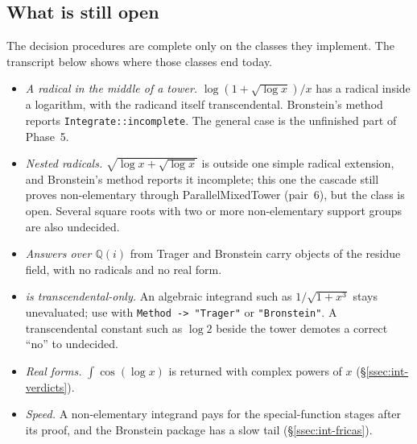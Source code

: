 \subsection{What is still open}
\label{ssec:int-open}

The decision procedures are complete only on the classes they implement. The
transcript below shows where those classes end today.

\begin{codepairs}
\end{codepairs}

\begin{tcolorbox}[enhanced, breakable, colback=black!2, colframe=black!45,
  boxrule=0.4pt, left=7pt, right=7pt, top=4pt, bottom=5pt,
  colbacktitle=black!7, coltitle=black, fonttitle=\bfseries,
  title={What is still open (v0.6664)}]
\begin{itemize}
\item \emph{A radical in the middle of a tower.} \(\log(1+\sqrt{\log x})/x\) has a
radical inside a logarithm, with the radicand itself transcendental. Bronstein's
method reports \texttt{Integrate::incomplete}. The general case is the unfinished
part of Phase~5.
\item \emph{Nested radicals.} \(\sqrt{\log x+\sqrt{\log x}}\) is outside one simple
radical extension, and Bronstein's method reports it incomplete; this one the
cascade still proves non-elementary through ParallelMixedTower (pair~6), but the
class is open. Several square roots with two or more non-elementary support groups
are also undecided.
\item \emph{Answers over \(\mathbb{Q}(i)\)} from Trager and Bronstein carry
 objects of the residue field, with no radicals and no real form.
\item \emph{ is
transcendental-only.} An algebraic integrand such as \(1/\sqrt{1+x^3}\) stays
unevaluated; use  with \texttt{Method -> "Trager"} or
\texttt{"Bronstein"}. A transcendental constant such as \(\log 2\) beside the tower
demotes a correct ``no'' to undecided.
\item \emph{Real forms.} \(\int\cos(\log x)\) is returned with complex powers of
\(x\) (\S\ref{ssec:int-verdicts}).
\item \emph{Speed.} A non-elementary integrand pays for the special-function stages
after its proof, and the Bronstein package has a slow tail
(\S\ref{ssec:int-fricas}).
\end{itemize}
\end{tcolorbox}

